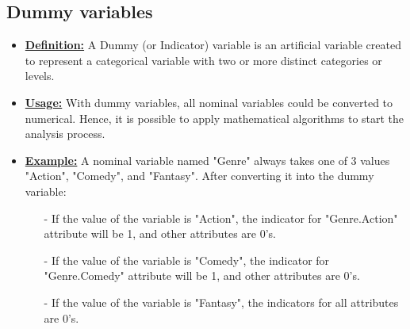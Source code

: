 \subsection{Dummy variables}

        \begin{itemize}
            \item \textbf{\underline{Definition:}} A Dummy (or Indicator) variable is an artificial variable created to represent a categorical variable with two or more distinct categories or levels.

            \item \textbf{\underline{Usage:}} With dummy variables, all nominal variables could be converted to numerical. Hence, it is possible to apply mathematical algorithms to start the analysis process.

            \item \textbf{\underline{Example:}} A nominal variable named "Genre" always takes one of 3 values "Action", "Comedy", and "Fantasy". After converting it into the dummy variable: 
            \begin{itemize}
                \item[-] If the value of the variable is "Action", the indicator for "Genre.Action" attribute will be 1, and other attributes are 0's.
                \item[-] If the value of the variable is "Comedy", the indicator for "Genre.Comedy" attribute will be 1, and other attributes are 0's.
                \item[-] If the value of the variable is "Fantasy", the indicators for all attributes are 0's.
            \end{itemize}
            
        \end{itemize}

